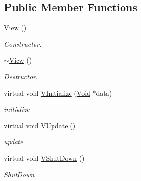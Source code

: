\subsection*{Public Member Functions}
\begin{DoxyCompactItemize}
\item 
\hypertarget{classContent_1_1View_1_1Admin_1_1View_a0082dfce3b336edc12645b52e241b723}{
\hyperlink{classContent_1_1View_1_1Admin_1_1View_a0082dfce3b336edc12645b52e241b723}{View} ()}
\label{classContent_1_1View_1_1Admin_1_1View_a0082dfce3b336edc12645b52e241b723}

\begin{DoxyCompactList}\small\item\em Constructor. \item\end{DoxyCompactList}\item 
\hypertarget{classContent_1_1View_1_1Admin_1_1View_aefeabee2dd4de0c7803f93f7bb55ff92}{
\hyperlink{classContent_1_1View_1_1Admin_1_1View_aefeabee2dd4de0c7803f93f7bb55ff92}{$\sim$View} ()}
\label{classContent_1_1View_1_1Admin_1_1View_aefeabee2dd4de0c7803f93f7bb55ff92}

\begin{DoxyCompactList}\small\item\em Destructor. \item\end{DoxyCompactList}\item 
\hypertarget{classContent_1_1View_1_1Admin_1_1View_adef6e550ff03890782b7beb7a7f98f33}{
virtual void \hyperlink{classContent_1_1View_1_1Admin_1_1View_adef6e550ff03890782b7beb7a7f98f33}{VInitialize} (\hyperlink{structVoid}{Void} $\ast$data)}
\label{classContent_1_1View_1_1Admin_1_1View_adef6e550ff03890782b7beb7a7f98f33}

\begin{DoxyCompactList}\small\item\em initialize \item\end{DoxyCompactList}\item 
\hypertarget{classContent_1_1View_1_1Admin_1_1View_a5982810412b7e7d462cd2542a0c39c7b}{
virtual void \hyperlink{classContent_1_1View_1_1Admin_1_1View_a5982810412b7e7d462cd2542a0c39c7b}{VUpdate} ()}
\label{classContent_1_1View_1_1Admin_1_1View_a5982810412b7e7d462cd2542a0c39c7b}

\begin{DoxyCompactList}\small\item\em update \item\end{DoxyCompactList}\item 
\hypertarget{classContent_1_1View_1_1Admin_1_1View_a08bfd962ab8e33550e123ec0a32e4eb0}{
virtual void \hyperlink{classContent_1_1View_1_1Admin_1_1View_a08bfd962ab8e33550e123ec0a32e4eb0}{VShutDown} ()}
\label{classContent_1_1View_1_1Admin_1_1View_a08bfd962ab8e33550e123ec0a32e4eb0}

\begin{DoxyCompactList}\small\item\em ShutDown. \item\end{DoxyCompactList}\end{DoxyCompactItemize}
